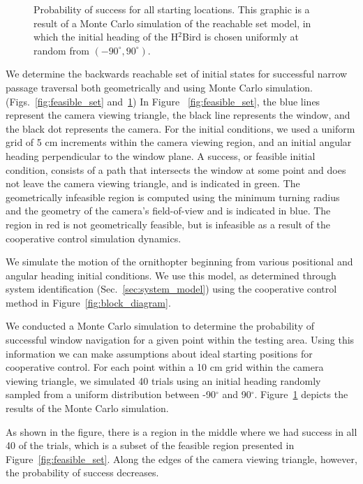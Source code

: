 \documentclass{aamas2013}
\begin{document}
\begin{figure}[tb]
\begin{minipage}[t]{0.47\linewidth}
\caption{Probability of success for all starting locations. This graphic is 
a result of a Monte Carlo simulation of the reachable set model, in which the 
initial heading of the H$^2$Bird is chosen uniformly at random from $(-90^{\circ},90^{\circ})$.}
\label{fig:heat_map}
\end{minipage}
\end{figure}

We determine the backwards reachable set of initial states for successful 
narrow passage traversal both geometrically and using Monte Carlo simulation. 
(Figs.~\ref{fig:feasible_set} and~\ref{fig:heat_map}) In Figure ~\ref{fig:feasible_set}, 
the blue lines represent the camera viewing triangle, the black line represents the window, and the black 
dot represents the camera. For the initial conditions, we used a uniform
grid of 5 cm increments within the camera viewing region, and an initial
angular heading perpendicular to the window plane. A success, or feasible 
initial condition, consists of a path that intersects the window at some 
point and does not leave the camera viewing triangle, and is indicated in 
green. The geometrically infeasible region is computed using the minimum 
turning radius and the geometry of the camera's field-of-view and is 
indicated in blue. The region in red is not geometrically feasible, but is 
infeasible as a result of the cooperative control simulation dynamics.

We simulate the motion of the ornithopter beginning from various positional 
and angular heading initial conditions. We use this model, as determined 
through system identification (Sec.~\ref{sec:system_model}) using the 
cooperative control method in Figure~\ref{fig:block_diagram}.

We conducted a Monte Carlo simulation to determine the probability of 
successful window navigation for a given point within the testing area. 
Using this information we can make assumptions about ideal starting 
positions for cooperative control. For each point within a 10 cm grid within 
the camera viewing triangle, we simulated 40 trials using an initial heading 
randomly sampled from a uniform distribution between -90$^{\circ}$ and 
90$^{\circ}$. Figure~\ref{fig:heat_map} depicts the results of the Monte 
Carlo simulation.

As shown in the figure, there is a region in the middle where we had success
in all 40 of the trials, which is a subset of the feasible region presented in
Figure~\ref{fig:feasible_set}. Along the edges of the camera viewing triangle,
however, the probability of success decreases.
\end{document}
